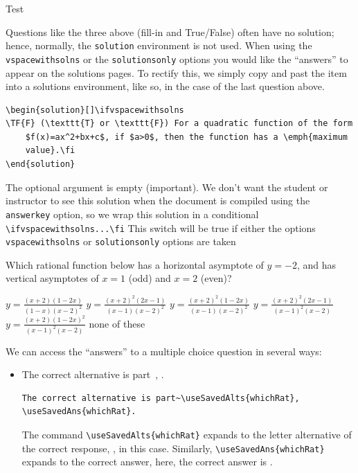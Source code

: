 \documentclass{article}
\begin{document}
\begin{exam}{Test\nExam}
\begin{theseproblems}
\begin{problem*}[2ea]
\begin{parts}
\pushProblem

\begin{eqComments}[Comments:]
Questions like the three above (fill-in and True/False) often have no
solution; hence, normally, the \texttt{solution} environment is not used. When
using the \texttt{vspacewithsolns} or the \texttt{solutionsonly} options
you would like the ``answers'' to appear on the solutions pages. To
rectify this, we simply copy and past the item into a solutions
environment, like so, in the case of the last question above.
\begin{verbatim}
\begin{solution}[]\ifvspacewithsolns
\TF{F} (\texttt{T} or \texttt{F}) For a quadratic function of the form
    $f(x)=ax^2+bx+c$, if $a>0$, then the function has a \emph{maximum
    value}.\fi
\end{solution}
\end{verbatim}
The optional argument is empty (important). We don't want the student or instructor to
see this solution when the document is compiled using the \texttt{answerkey}
option, so we wrap this solution in a conditional
\verb~\ifvspacewithsolns...\fi~ This switch will be true if either the
options \texttt{vspacewithsolns} or \texttt{solutionsonly} options are
taken
\end{eqComments}

\popProblem

    \item\label{whichRatFunc} Which rational function below has a horizontal asymptote of
    $y=-2$, and has vertical asymptotes of $x=1$ (odd) and $ x=2 $ (even)?
    \begin{answers}{3}\rowsep{6pt}
    \bChoices[label=whichRat]
         $ y = \frac{(x+2) (1-2x)}{(1-x)(x-2)^2} $\eAns
         $ y = \frac{(x+2)^2 (2x-1)}{(x-1)(x-2)^2} $\eAns
         $ y = \frac{(x+2)^2 (1-2x)}{(x-1)(x-2)^2} $\eAns
         $ y = \frac{(x+2)^2 (2x-1)}{(x-1)^2(x-2)} $\eAns
         $ y = \frac{(x+2) (1-2x)^2}{(x-1)^2(x-2)} $\eAns
         none of these\eAns
    \eChoices
    \end{answers}
\begin{solution}[]\ifvspacewithsolns
We can access the ``answers'' to a multiple choice question in several
ways:
\begin{itemize}
\item The correct alternative is part~,
.
\begin{verbatim}
The correct alternative is part~\useSavedAlts{whichRat},
\useSavedAns{whichRat}.
\end{verbatim}
The command \verb!\useSavedAlts{whichRat}! expands to the letter alternative of the
correct response, , in this case. Similarly,
\verb!\useSavedAns{whichRat}! expands to the correct answer, here, the
correct answer is .


\end{itemize}
\end{solution}
\end{parts}
\end{problem*}
\end{theseproblems}
\end{exam}
\end{document}
